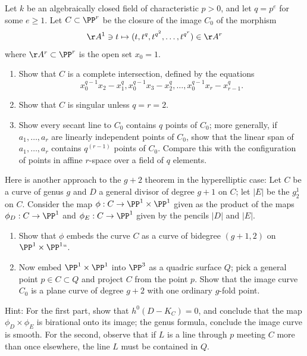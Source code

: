 \begin{npt}
\begin{exercise}
\label{strange curves} Let $k$ be an
%
algebraically closed field of characteristic $p>0$, and let $q=p^e$
for some $e\geq 1$. Let $C\subset \PP^r$
be the closure of the image $C_0$ of the morphism
$$
\AA^1 \ni t \mapsto (t, t^q, t^{q^2}, \dots , t^{q^{r}}) \in \AA^r
$$
where $\AA^r\subset \PP^r$ is the open set $x_0=1$.
\begin{enumerate}
\item Show that $C$ is a complete intersection, defined by the equations
$$
x_0^{q-1}x_2 - x_1^q, x_0^{q-1}x_3 - x_2^q,\dots,
x_0^{q-1}x_r - x_{r-1}^q.
$$
\item Show that $C$ is singular unless $q = r = 2$.
\item Show every secant line to $C_0$ contains $q$ points of $C_0$;
more generally, if
$a_1, \dots, a_r$ are linearly independent points of $C_0$, show that
the linear span of
$a_1, \dots, a_r$ contains $q^{(r-1)}$ points of $C_0$.  Compare this
with the configuration of
points in affine $r$-space over a field of $q$ elements.
\end{enumerate}
\end{exercise}
\end{npt}

\begin{exercise}
Here is another approach to the $g+2$ theorem in the hyperelliptic case:
%
Let $C$ be a 
%
curve of genus $g$ and $D$ a general divisor
of degree $g+1$ on $C$; let $|E|$ be the $g^1_2$ on $C$.
Consider the map $\phi : C \to \PP^1 \times \PP^1$ given as the product
of the maps $\phi_D : C \to \PP^1$ and $\phi_E : C \to \PP^1$ given by
the pencils $|D|$ and $|E|$.
\begin{enumerate}
\item Show that $\phi$ embeds the curve $C$ as a curve of bidegree
$(g+1,2)$ on $\PP^1 \times \PP^1` `$.
\item Now embed $\PP^1 \times \PP^1$ into $\PP^3$ as a quadric surface
$Q$; pick a general point $p \in C \subset Q$ and project $C$ from the
point $p$. Show that the image curve $C_0$ is a plane curve of degree
$g+2$ with one ordinary $g$-fold point.
\end{enumerate}

Hint: For the first part, show that $h^0(D - K_C) = 0$, and conclude
that the map $\phi_D \times \phi_E$ is birational onto its image; 
the genus formula, conclude the image curve is smooth. For the
second, observe that if $L$ is a line through $p$ meeting $C$ more than
once elsewhere, the line $L$ must be contained in $Q$.
\end{exercise}

